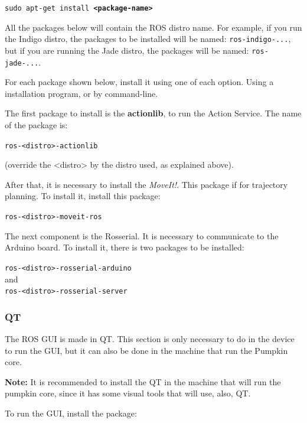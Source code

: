 \documentclass[oneside,a4paper,titlepage]{article}
\begin{document}
\begin{center}
\texttt{sudo apt-get install \textbf{<package-name>}}
\end{center}


All the packages below will contain the ROS distro name. For example, if you run the Indigo distro, the packages to be installed will be named: \texttt{ros-indigo-...}, but if you are running the Jade distro, the packages will be named: \texttt{ros-jade-...}.

For each package shown below, install it using one of each option. Using a installation program, or by command-line.

The first package to install is the \textbf{actionlib}, to run the Action Service. The name of the package is:

\begin{center}
\texttt{ros-<distro>-actionlib}
\end{center}

(override the <distro> by the distro used, as explained above).

After that, it is necessary to install the \textit{MoveIt!}. This package if for trajectory planning. To install it, install this package:

\begin{center}
\texttt{ros-<distro>-moveit-ros}
\end{center}

The next component is the Rosserial. It is necessary to communicate to the Arduino board. To install it, there is two packages to be installed:

\begin{center}
\texttt{ros-<distro>-rosserial-arduino}\\
	and\\
\texttt{ros-<distro>-rosserial-server}
\end{center}
 
\subsubsection{QT}

The ROS GUI is made in QT. This section is only necessary to do in the device to run the GUI, but it can also be done in the machine that run the Pumpkin core.

\textbf{Note: } It is recommended to install the QT in the machine that will run the pumpkin core, since it has some visual tools that will use, also, QT.

To run the GUI, install the package: 
\end{document}
